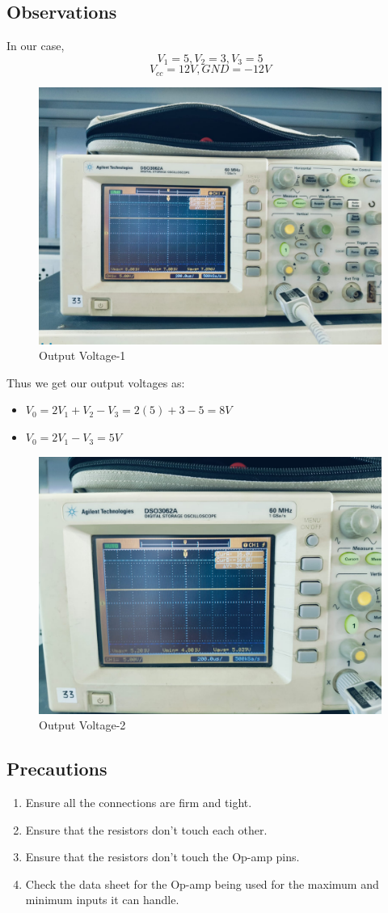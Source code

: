\documentclass[a4paper,12pt]{article}
\begin{document}
\subsection{Observations}
In our case, 
$$V_{1}=5, 
V_2=3, 
V_3=5$$
$$V_{cc}=12 V, GND = -12 V$$
\begin{figure}
    \centering
    \includegraphics[width=0.5\linewidth]{fig/8v.jpeg}
    \caption{Output Voltage-1}
    \label{fig:enter-label}
\end{figure}
Thus we get our output voltages as:\\
\begin{itemize}
    \item $V_0=2V_1+V_2-V_3=2(5)+3-5=8V$\\
    \item $V_0=2V_1-V_3=5V$
\end{itemize}
\begin{figure}
    \centering
    \includegraphics[width=0.5\linewidth]{fig/5v.jpeg}
    \caption{Output Voltage-2}
    \label{fig:enter-label}
\end{figure}
\subsection{Precautions}
\begin{enumerate}
    \item Ensure all the connections are firm and tight.
    \item Ensure that the resistors don't touch each other.
    \item Ensure that the resistors don't touch the Op-amp pins.
    \item Check the data sheet for the Op-amp being used for the maximum and minimum inputs it can handle.
\end{enumerate}
\end{document}
